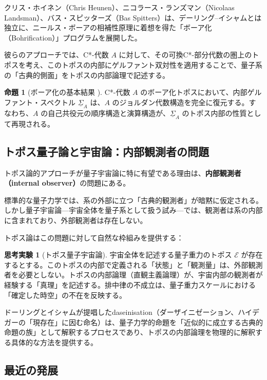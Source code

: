 \documentclass[12pt,a4paper]{ltjsarticle}
\theoremstyle{definition}
\newtheorem{proposition}[definition]{命題}
\newtheorem{thought}[definition]{思考実験}
\begin{document}
クリス・ホイネン（Chris Heunen）、ニコラース・ランズマン（Nicolaas Landsman）、バス・スピッターズ（Bas Spitters）は、デーリング--イシャムとは独立に、ニールス・ボーアの相補性原理に着想を得た「ボーア化（Bohrification）」プログラムを展開した\cite{HeunenLandsmanSpitters2009}。

彼らのアプローチでは、C*-代数 $A$ に対して、その可換C*-部分代数の圏上のトポスを考え、このトポスの内部にゲルファント双対性を適用することで、量子系の「古典的側面」をトポスの内部論理で記述する。

\begin{proposition}[ボーア化の基本結果 \cite{HeunenLandsmanSpitters2009}]
C*-代数 $A$ のボーア化トポスにおいて、内部ゲルファント・スペクトル $\underline{\Sigma}_A$ は、$A$ のジョルダン代数構造を完全に復元する。すなわち、$A$ の自己共役元の順序構造と演算構造が、$\underline{\Sigma}_A$ のトポス内部の性質として再現される。
\end{proposition}

\subsection{トポス量子論と宇宙論：内部観測者の問題}

トポス論的アプローチが量子宇宙論に特に有望である理由は、\textbf{内部観測者（internal observer）}の問題にある。

標準的な量子力学では、系の外部に立つ「古典的観測者」が暗黙に仮定される。しかし量子宇宙論---宇宙全体を量子系として扱う試み---では、観測者は系の内部に含まれており、外部観測者は存在しない\cite{DeWitt1967, Hartle1995}。

トポス論はこの問題に対して自然な枠組みを提供する：

\begin{thought}[トポス量子宇宙論]
宇宙全体を記述する量子重力のトポス $\mathcal{E}$ が存在するとする。このトポスの内部で定義される「状態」と「観測量」は、外部観測者を必要としない。トポスの内部論理（直観主義論理）が、宇宙内部の観測者が経験する「真理」を記述する。排中律の不成立は、量子重力スケールにおける「確定した時空」の不在を反映する。
\end{thought}

ドーリングとイシャムが提唱したdas\-ein\-i\-sa\-tion（ダーザイニゼーション、ハイデガーの「現存在」に因む命名）\cite{DoeringIsham2008a}は、量子力学的命題を「近似的に成立する古典的命題の族」として解釈するプロセスであり、トポスの内部論理を物理的に解釈する具体的な方法を提供する。

\subsection{最近の発展}
\end{document}
